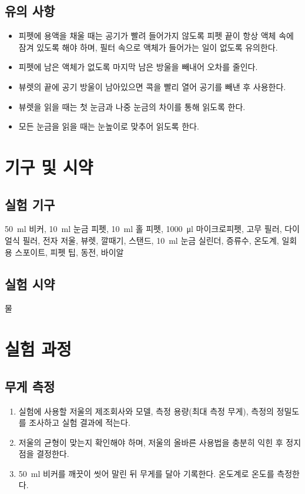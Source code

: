 \documentclass{GSHS-chemexp}
\begin{document}
	\subsection{유의 사항}
	\begin{itemize}
		\item 피펫에 용액을 채울 때는 공기가 빨려 들어가지 않도록
		피펫 끝이 항상 액체 속에 잠겨 있도록 해야 하며,
		필터 속으로 액체가 들어가는 일이 없도록 유의한다.
		\item 피펫에 남은 액체가 없도록 마지막 남은 방울을 빼내어 오차를 줄인다.
		\item 뷰렛의 끝에 공기 방울이 남아있으면
		콕을 빨리 열어 공기를 빼낸 후 사용한다.
		\item 뷰렛을 읽을 때는 첫 눈금과 나중 눈금의 차이를 통해 읽도록 한다.
		\item 모든 눈금을 읽을 때는 눈높이로 맞추어 읽도록 한다.
	\end{itemize}
	
	\section{기구 및 시약}
	
	\subsection{실험 기구}
	\SI{50}{\milli\litre} 비커, \SI{10}{\milli\litre} 눈금 피펫,
	\SI{10}{\milli\litre} 홀 피펫, \SI{1000}{\micro\litre} 마이크로피펫,
	고무 필러, 다이얼식 필러, 전자 저울, 뷰렛, 깔때기, 스탠드,
	\SI{10}{\milli\litre} 눈금 실린더, 증류수, 온도계, 일회용 스포이트,
	피펫 팁, 동전, 바이알
	
	\subsection{실험 시약}
	물
	
	\section{실험 과정}
	
	\subsection{무게 측정}
	\begin{enumerate}
		\item 실험에 사용할 저울의 제조회사와 모델, 측정 용량(최대 측정 무게),
		측정의 정밀도를 조사하고 실험 결과에 적는다.
		\item 저울의 균형이 맞는지 확인해야 하며,
		저울의 올바른 사용법을 충분히 익힌 후 정지점을 결정한다.
		\item \SI{50}{\milli\litre} 비커를 깨끗이 씻어 말린 뒤
		무게를 달아 기록한다. 온도계로 온도를 측정한다.
	\end{enumerate}
	
\end{document}
